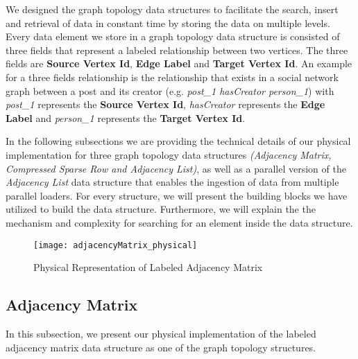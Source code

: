 {We designed the graph topology data structures to facilitate the search, insert and retrieval of data in constant time by storing the data on multiple levels. Every data element we store in a graph topology data structure is consisted of three fields that represent a labeled relationship between two vertices. The three fields are \textbf{Source Vertex Id}, \textbf{Edge Label} and \textbf{Target Vertex Id}. An example for a three fields relationship is the relationship that exists in a social network graph between a post and its creator (e.g. \textit{post\_1 hasCreator person\_1}) with \textit{post\_1} represents the \textbf{Source Vertex Id}, \textit{hasCreator} represents the \textbf{Edge Label} and \textit{person\_1} represents the \textbf{Target Vertex Id}.

In the following subsections we are providing the technical details of our physical implementation for three graph topology data structures \textit{(Adjacency Matrix, Compressed Sparse Row and Adjacency List)}, as well as a parallel version of the \textit{Adjacency List} data structure that enables the ingestion of data from multiple parallel loaders. For every structure, we will present the building blocks we have utilized to build the data structure. Furthermore, we will explain the the mechanism and complexity for searching for an element inside the data structure.





\begin{figure}
\centering
\texttt{[image: adjacencyMatrix\_physical]}
\caption{Physical Representation of Labeled Adjacency Matrix}
\label{fig_adjacencyMatrix_physical}
\end{figure} 

\subsection{Adjacency Matrix}

In this subsection, we present our physical implementation of the labeled adjacency matrix data structure as one of the graph topology structures.

\begin{itemize}


\end{itemize}}

